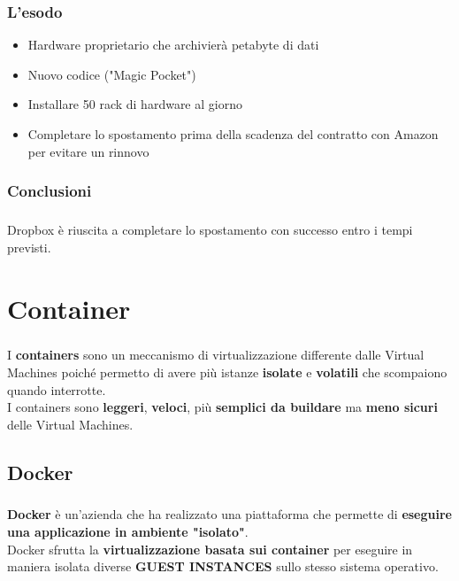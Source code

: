 \documentclass[a4paper, 12pt]{report}
\begin{document}
        \subsection{L'esodo}
        \begin{itemize}
          \item Hardware proprietario che archivierà petabyte di dati
          \item Nuovo codice ("Magic Pocket")
          \item Installare 50 rack di hardware al giorno
          \item Completare lo spostamento prima della scadenza del contratto con Amazon per evitare un rinnovo
        \end{itemize}
        \subsection{Conclusioni}
        \paragraph{}Dropbox è riuscita a completare lo spostamento con successo entro i tempi previsti.
    \chapter{Container}
    \paragraph{}I \textbf{containers} sono un meccanismo di virtualizzazione differente dalle Virtual Machines poiché 
    permetto di avere più istanze \textbf{isolate} e \textbf{volatili} che scompaiono quando interrotte.\\
    I containers sono \textbf{leggeri}, \textbf{veloci}, più \textbf{semplici da buildare} ma \textbf{meno sicuri} delle Virtual Machines.
    \section{Docker}
    \paragraph{}\textbf{Docker} è un'azienda che ha realizzato una piattaforma che permette di \textbf{eseguire una applicazione in ambiente "isolato"}.\\
    Docker sfrutta la \textbf{virtualizzazione basata sui container} per eseguire in maniera isolata diverse \textbf{GUEST INSTANCES} sullo stesso sistema operativo.
\end{document}
